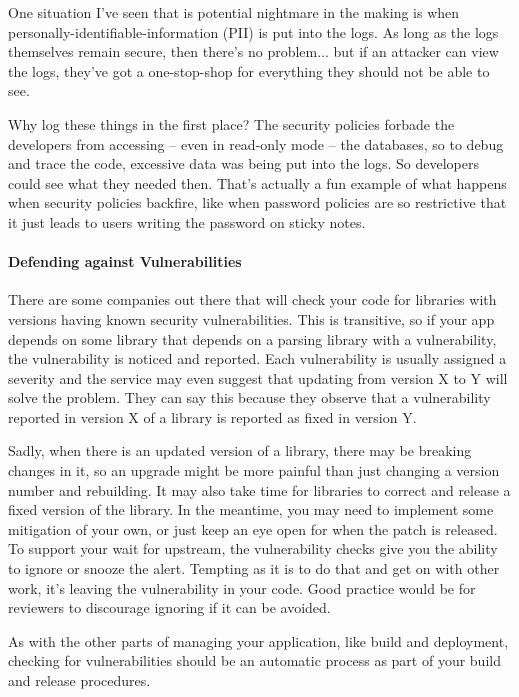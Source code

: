 \documentclass[a4paper]{report}
\begin{document}
One situation I've seen that is potential nightmare in the making is when personally-identifiable-information (PII) is put into the logs. As long as the logs themselves remain secure, then there's no problem... but if an attacker can view the logs, they've got a one-stop-shop for everything they should not be able to see.

Why log these things in the first place?  The security policies forbade the developers from accessing -- even in read-only mode -- the databases, so to debug and trace the code, excessive data was being put into the logs. So developers could see what they needed then. That's actually a fun example of what happens when security policies backfire, like when password policies are so restrictive that it just leads to users writing the password on sticky notes.


\paragraph{Defending against Vulnerabilities}
There are some companies out there that will check your code for libraries with versions having known security vulnerabilities. This is transitive, so if your app depends on some library that depends on a parsing library with a vulnerability, the vulnerability is noticed and reported. Each vulnerability is usually assigned a severity and the service may even suggest that updating from version X to Y will solve the problem. They can say this because they observe that a vulnerability reported in version X of a library is reported as fixed in version Y. 

Sadly, when there is an updated version of a library, there may be breaking changes in it, so an upgrade might be more painful than just changing a version number and rebuilding. It may also take time for libraries to correct and release a fixed version of the library. In the meantime, you may need to implement some mitigation of your own, or just keep an eye open for when the patch is released. To support your wait for upstream, the vulnerability checks give you the ability to ignore or snooze the alert. Tempting as it is to do that and get on with other work, it's leaving the vulnerability in your code. Good practice would be for reviewers to discourage ignoring if it can be avoided.

As with the other parts of managing your application, like build and deployment, checking for vulnerabilities should be an automatic process as part of your build and release procedures. 










\end{document}
